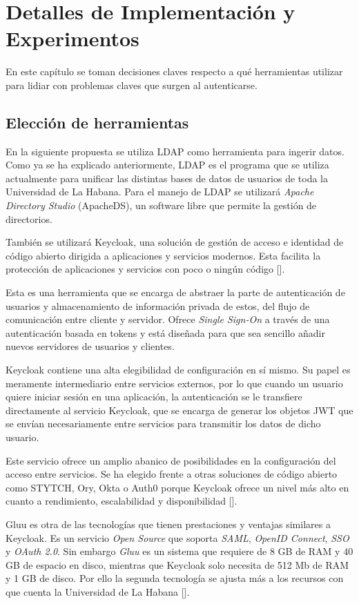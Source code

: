 \chapter{Detalles de Implementación y Experimentos}\label{chapter:implementation}

En este capítulo se toman decisiones claves respecto a qué herramientas utilizar para lidiar con problemas claves que surgen al autenticarse.

\section*{Elección de herramientas}
En la siguiente propuesta se utiliza LDAP como herramienta para ingerir datos. Como ya se ha explicado anteriormente, LDAP es el programa que se utiliza actualmente para unificar las distintas bases de datos de usuarios de toda la Universidad de La Habana. Para el manejo de LDAP se utilizará \textit{Apache Directory Studio} (ApacheDS), un software libre que permite la gestión de directorios.

También se utilizará Keycloak, una solución de gestión de acceso e identidad de código abierto dirigida a aplicaciones y servicios modernos. Esta facilita la protección de aplicaciones y servicios con poco o ningún código [\cite{muyon2020metodos}]. 

Esta es una herramienta que se encarga de abstraer la parte de autenticación de usuarios y almacenamiento de información privada de estos, del flujo de comunicación entre cliente y servidor. Ofrece \textit{Single Sign-On} a través de una autenticación basada en tokens y está diseñada para que sea sencillo añadir nuevos servidores de usuarios y clientes.

Keycloak contiene una alta elegibilidad de configuración en sí mismo. Su papel es meramente intermediario entre servicios externos, por lo que cuando un usuario quiere iniciar sesión en una aplicación, la autenticación se le transfiere directamente al servicio Keycloak, que se encarga de generar los objetos JWT que se envían necesariamente entre servicios para transmitir los datos de dicho usuario.

Este servicio ofrece un amplio abanico de posibilidades en la configuración del acceso entre servicios. Se ha elegido frente a otras soluciones de código abierto como STYTCH, Ory, Okta o Auth0 porque Keycloak ofrece un nivel más alto en cuanto a rendimiento, escalabilidad y disponibilidad [\cite{lobato2022regulacion}]. 

Gluu es otra de las tecnologías que tienen prestaciones y ventajas similares a Keycloak. Es un servicio \textit{Open Source} que soporta \textit{SAML}, \textit{OpenID Connect}, \textit{SSO} y \textit{OAuth 2.0}. Sin embargo \textit{Gluu} es un sistema que requiere de 8 GB de RAM y 40 GB de espacio en disco, mientras que Keycloak solo necesita de 512 Mb de RAM y 1 GB de disco. Por ello la segunda tecnología se ajusta más a los recursos con que cuenta  la Universidad de La Habana [\cite{vassallo2017continuous}].

